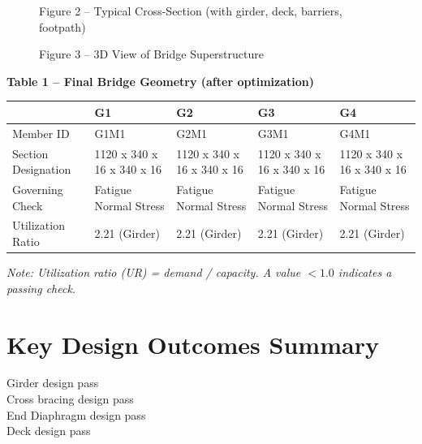 \documentclass[12pt,a4paper]{report}
\numberwithin{table}{chapter}
\numberwithin{figure}{chapter}
\begin{document}
\newpage

\begin{figure}[H]
\centering
{}
\caption*{Figure 2 -- Typical Cross-Section (with girder, deck, barriers, footpath)}
\end{figure}

\begin{figure}[H]
\centering
{}
\caption*{Figure 3 -- 3D View of Bridge Superstructure}
\end{figure}

\noindent\textbf{Table 1 -- Final Bridge Geometry (after optimization)}

\vspace{0.4em}
\noindent
\begin{tabular}{|C{2.8cm}|C{3.0cm}|C{3.0cm}|C{3.0cm}|C{3.0cm}|}
\hline
  \textbf{} &
  \textbf{G1} &
  \textbf{G2} &
  \textbf{G3} &
  \textbf{G4} \\
\hline
Member ID & G1M1 & G2M1 & G3M1 & G4M1 \\
\hline
Section Designation & 1120 x 340 x 16 x 340 x 16 & 1120 x 340 x 16 x 340 x 16 & 1120 x 340 x 16 x 340 x 16 & 1120 x 340 x 16 x 340 x 16 \\
\hline
Governing Check & Fatigue Normal Stress & Fatigue Normal Stress & Fatigue Normal Stress & Fatigue Normal Stress \\
\hline
Utilization Ratio & 2.21 (Girder) & 2.21 (Girder) & 2.21 (Girder) & 2.21 (Girder) \\
\hline
\end{tabular}

\vspace{0.4em}
\noindent\textit{Note: Utilization ratio (UR) = demand / capacity. A value $< 1.0$ indicates a passing check.}

\vspace{1em}

\section*{Key Design Outcomes Summary}
\label{sec:key-outcomes}

\noindent Girder design pass \\
Cross bracing design pass \\
End Diaphragm design pass \\
Deck design pass
\end{document}
